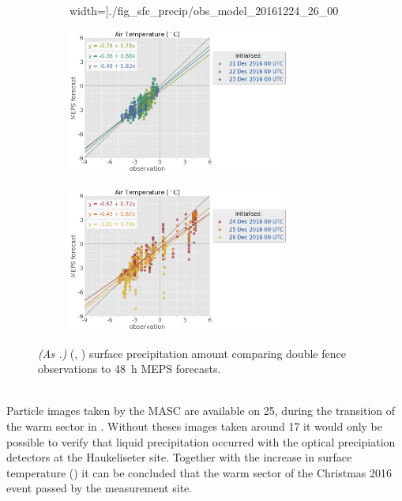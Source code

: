 \begin{figure}[H]
\begin{subfigure}[b]{0.49\textwidth}
		width=\textwidth]{./fig_sfc_precip/obs_model_20161224_26_00}
		\caption{}\label{fig:scat:precip2426}
	\end{subfigure}
	\begin{subfigure}[b]{0.49\textwidth}
		\centering
		\includegraphics[trim={25.cm 15.5cm 0cm 3.6cm},clip,
		width=0.8\textwidth]{./fig_sfc_temp/obs_model_20161221_23_00_label}
	\end{subfigure}
	\begin{subfigure}[b]{0.49\textwidth}
		\centering
		\includegraphics[trim={25.cm 15.5cm 0cm 3.6cm},clip,
		width=0.8\textwidth]{./fig_sfc_temp/obs_model_20161224_26_00_label}
	\end{subfigure}
	\caption{\textit{(As .)}  (\protect{}, \protect{}) surface precipitation amount comparing double fence observations to \SI{48}{\hour} MEPS forecasts.} \label{fig:scat:precip}
\end{figure}
\noindent
\\
Particle images taken by the MASC are available on \SI{25}{\dec}, during the transition of the warm sector in . Without theses images taken around \SI{17}{\UTC} it would only be possible to verify that liquid precipitation occurred with the optical precipiation detectors at the Haukeliseter site. Together with the increase in surface temperature () it can be concluded that the warm sector of the Christmas 2016 event passed by the measurement site.

